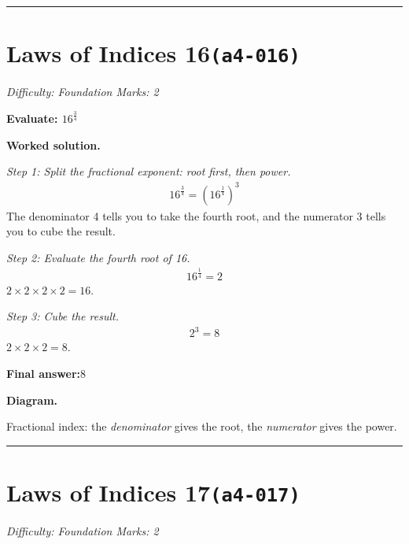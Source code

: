 \documentclass[11pt]{article}
\newcommand{\question}[1]{\par\medskip\noindent\textbf{#1}\par}
\begin{document}
\medskip\hrule

\section*{Laws of Indices 16\quad\small\texttt{(a4-016)}}
\textit{Difficulty: Foundation \quad\textbar\quad Marks: 2}

\question{Evaluate: \( 16^{\frac{3}{4}} \)}

\textbf{Worked solution.}

\textit{Step 1: Split the fractional exponent: root first, then power.}
\[\begin{gathered}
16^{\frac{3}{4}} = \left(16^{\frac{1}{4}}\right)^3
\end{gathered}\]
The denominator 4 tells you to take the fourth root, and the numerator 3 tells you to cube the result.

\textit{Step 2: Evaluate the fourth root of 16.}
\[\begin{gathered}
16^{\frac{1}{4}} = 2
\end{gathered}\]
\( 2 \times 2 \times 2 \times 2 = 16 \).

\textit{Step 3: Cube the result.}
\[\begin{gathered}
2^3 = 8
\end{gathered}\]
\( 2 \times 2 \times 2 = 8 \).

\begin{answerbox}
\textbf{Final answer:}\quad \(\displaystyle 8\)
\end{answerbox}
\textbf{Diagram.}

\begin{center}
\end{center}
\small Fractional index: the \emph{denominator} gives the root, the \emph{numerator} gives the power.\normalsize

\medskip\hrule

\section*{Laws of Indices 17\quad\small\texttt{(a4-017)}}
\textit{Difficulty: Foundation \quad\textbar\quad Marks: 2}
\end{document}
